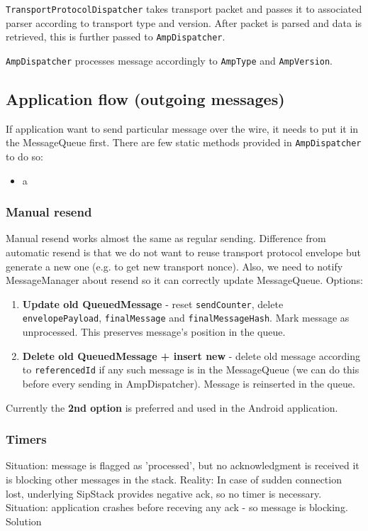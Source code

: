 \documentclass[a4paper,10pt]{article}
\begin{document}
\verb#TransportProtocolDispatcher# takes transport packet and passes it to associated parser according to transport type and version. After packet is parsed and data is retrieved, this is further passed to \verb#AmpDispatcher#.

\verb#AmpDispatcher# processes message accordingly to \verb#AmpType# and \verb#AmpVersion#.


\subsection{Application flow (outgoing messages)}

If application want to send particular message over the wire, it needs to put it in the MessageQueue first. There are few static methods provided in \verb#AmpDispatcher# to do so:

\begin{itemize}
\item a
\end{itemize}


\subsubsection{Manual resend}
Manual resend works almost the same as regular sending. Difference from automatic resend is that we do not want to reuse transport protocol envelope but generate a new one (e.g. to get new transport nonce). Also, we need to notify MessageManager about resend so it can correctly update MessageQueue. Options: 
\begin{enumerate}
\item \textbf{Update old QueuedMessage} - reset \verb#sendCounter#, delete \verb#envelopePayload#, \verb#finalMessage# and \linebreak \verb#finalMessageHash#. Mark message as unprocessed. This preserves message's position in the queue. \\
\item \textbf{Delete old QueuedMessage + insert new} - delete old message according to \verb#referencedId# if any such message is in the MessageQueue (we can do this before every sending in AmpDispatcher). Message is reinserted in the queue.
\end{enumerate}

Currently the \textbf{2nd option} is preferred and used in the Android application.

\subsubsection{Timers}
Situation: message is flagged as 'processed', but no acknowledgment is received it is blocking other messages in the stack. 
Reality: In case of sudden connection lost, underlying SipStack provides negative ack, so no timer is necessary.
Situation: application crashes before receving any ack - so message is blocking.
Solution
\end{document}
